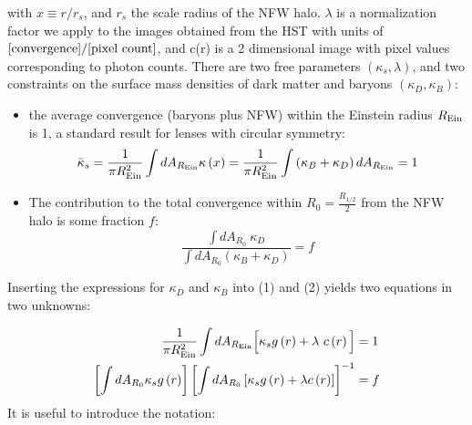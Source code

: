 \noindent with $x\equiv r/r_s$, and $r_s$ the scale radius of the NFW halo. $\lambda$ is a normalization factor we apply to the images obtained from the HST with units of $[\rm{convergence]}/[\rm{pixel \ count}]$, and c(r) is a 2 dimensional image with pixel values corresponding to photon counts. There are two free parameters $\left(\kappa_s, \lambda\right)$, and two constraints on the surface mass densities of dark matter and baryons $\left(\kappa_D,\kappa_B\right)$: 
\begin{itemize}
	\item the average convergence (baryons plus NFW) within the Einstein radius $R_{\rm{Ein}}$ is 1, a standard result for lenses with circular symmetry:
	\begin{equation}
	\nonumber {\bar\kappa_s}  = \frac{1}{\pi R_{\rm{Ein}}^2} \int dA_{R_{\rm{Ein}}} \kappa \left(x\right) = \frac{1}{\pi R_{\rm{Ein}}^2} \int \left(\kappa_B + \kappa_{D}\right)dA_{R_{\rm{Ein}}} = 1
	\end{equation}
	
	\item The contribution to the total convergence within $R_0 = \frac{R_{1/2}}{2}$ from the NFW halo is some fraction $f$:
	\begin{equation}
	\nonumber \frac{\int dA_{R_0} \ \kappa_{D}}{\int dA_{R_0} \left(\kappa_B + \kappa_{D}\right)} = f  
	\end{equation}
\end{itemize}
Inserting the expressions for $\kappa_D$ and $\kappa_B$ into (1) and (2) yields two equations in two unknowns:

\begin{align*}
\frac{1}{\pi R_{\rm{Ein}}^2} \int dA_{R_{\rm{Ein}}} \Big[\kappa_s g\left(r\right) + \lambda \ c\left(r\right)\Big] &= 1 \\
\left[\int dA_{R_0} \kappa_s g\left(r\right)\right]\left[\int dA_{R_0} \left[\kappa_s g\left(r\right) + \lambda c\left(r\right)\right]\right]^{-1}&= f
\end{align*}
\noindent It is useful to introduce the notation:

